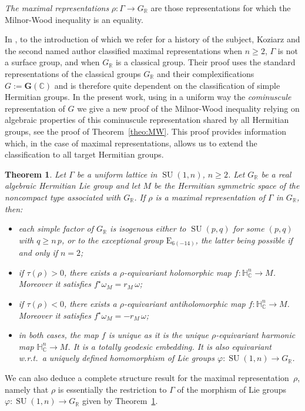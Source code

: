 \documentclass[JEP,XML,SOM,Unicode,NoFloatCountersInSection]{cedram}
\theoremstyle{plain}
\newtheorem{theoA}{Theorem}
\theoremstyle{definition}
\DeclareMathOperator{\SU}{SU}
\newcommand{\bC}{\mathbb{C}}
\newcommand{\bR}{\mathbb{R}}
\newcommand{\HC}{{\mathbb{H}^n_\mathbb{C}}}
\newcommand{\bfG}{\boldsymbol{G}}
\newcommand{\rkm}{{r_M}}
\begin{document}
\emph{The maximal representations} $\rho:\Gamma\to G_\bR$ are those representations
for which the Milnor-Wood inequality is an equality.

In \cite{KM}, to the introduction of which we refer for a history of the subject, Koziarz and the
second named author classified maximal representations when $n\geq 2$, \ie $\Gamma$ is not a surface
group, and when $G_\bR$ is a classical group.
Their proof uses the standard representations of the classical groups $G_\bR$ and their
complexifications $G:=\bfG(\bC)$ and is therefore quite dependent on the classification of simple
Hermitian groups.
In the present work, using in a uniform way the \emph{cominuscule} representation of $G$
we give a new proof of the Milnor-Wood inequality relying on
algebraic properties of this cominuscule representation shared by all Hermitian groups,
see the proof of Theorem~\ref{theo:MW}.
This proof provides information which,
in the case of maximal representations, allows us to extend
the classification to all target Hermitian groups.

\begin{theoA}
\label{maintheo}
Let $\Gamma$ be a uniform lattice in $\SU(1,n)$, $n\geq 2$.
Let $G_\bR$ be a real algebraic Hermitian Lie group and let $M$ be the Hermitian symmetric space of
the noncompact type associated with $G_\bR$. If $\rho$ is a maximal
representation of $\Gamma$ in $G_\bR$, then:
\begin{itemize}
\item each simple factor of $G_\bR$ is isogenous either to
$\SU(p,q)$ for some $(p,q)$ with $q\geq n\, p$,
or to the exceptional group $\mathrm{E}_{6(-14)}$, the latter being possible if and only if $n=2$;
\item if $\tau(\rho)>0$, there exists a
$\rho$-equivariant holomorphic map $f:\HC\to M$. Moreover it satisfies
$f^\star\omega_M=\rkm\,\omega$;
\item if $\tau(\rho)<0$, there exists a $\rho$-equivariant antiholomorphic map $f:\HC\to
M$. Moreover it satisfies $f^\star\omega_M=-\rkm\,\omega$;
\item in both cases, the map $f$ is unique as it is the unique $\rho$-equivariant harmonic map $\HC\to
M$. It
is a totally geodesic embedding. It is also equivariant w.r.t.\
a uniquely defined homomorphism of Lie groups $\varphi: \SU(1,n)\to G_\bR$.
\end{itemize}
\end{theoA}

We can also deduce a complete structure result
for the maximal representation~$\rho$, namely that $\rho$ is essentially the restriction to $\Gamma$ of
the morphism of Lie
groups \hbox{$\varphi: \SU(1,n) \to G_\bR$} given by Theorem~\ref{maintheo}.
\end{document}
